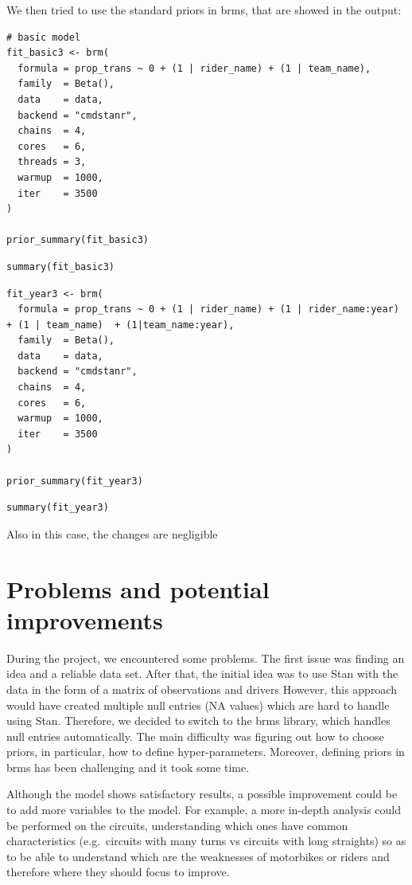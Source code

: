 \documentclass[
]{article}
\begin{document}
We then tried to use the standard priors in brms, that are showed in the
output:

\begin{verbatim}
# basic model
fit_basic3 <- brm(
  formula = prop_trans ~ 0 + (1 | rider_name) + (1 | team_name),
  family  = Beta(),
  data    = data,
  backend = "cmdstanr",
  chains  = 4,
  cores   = 6,
  threads = 3,
  warmup  = 1000,
  iter    = 3500
)

prior_summary(fit_basic3)
\end{verbatim}

\begin{verbatim}
summary(fit_basic3)
\end{verbatim}

\begin{verbatim}
fit_year3 <- brm(
  formula = prop_trans ~ 0 + (1 | rider_name) + (1 | rider_name:year) + (1 | team_name)  + (1|team_name:year),
  family  = Beta(),
  data    = data,
  backend = "cmdstanr",
  chains  = 4,
  cores   = 6,
  warmup  = 1000,
  iter    = 3500
)

prior_summary(fit_year3)
\end{verbatim}

\begin{verbatim}
summary(fit_year3)
\end{verbatim}

Also in this case, the changes are negligible

\hypertarget{problems-and-potential-improvements}{%
\section{Problems and potential
improvements}\label{problems-and-potential-improvements}}

During the project, we encountered some problems. The first issue was
finding an idea and a reliable data set. After that, the initial idea
was to use Stan with the data in the form of a matrix of observations
and drivers However, this approach would have created multiple null
entries (NA values) which are hard to handle using Stan. Therefore, we
decided to switch to the brms library, which handles null entries
automatically. The main difficulty was figuring out how to choose
priors, in particular, how to define hyper-parameters. Moreover,
defining priors in brms has been challenging and it took some time.

Although the model shows satisfactory results, a possible improvement
could be to add more variables to the model. For example, a more
in-depth analysis could be performed on the circuits, understanding
which ones have common characteristics (e.g.~circuits with many turns vs
circuits with long straights) so as to be able to understand which are
the weaknesses of motorbikes or riders and therefore where they should
focus to improve.
\end{document}
